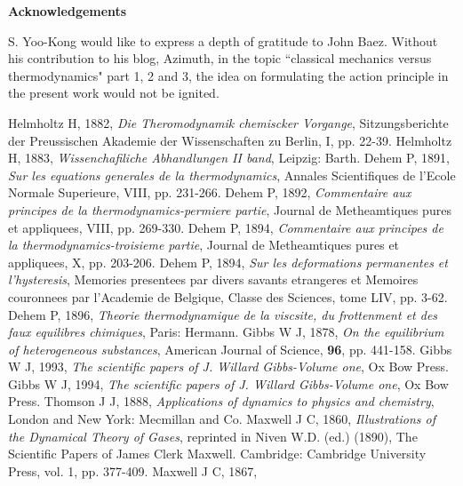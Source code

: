 \documentclass[12pt]{article}
\makeatletter
\numberwithin{equation}{section}
\newcommand\ackname{Acknowledgements}
\newenvironment{acknowledgements}{
	\titlepage
	\null\vfil
	\@beginparpenalty\@lowpenalty
	\begin{center}
		\bfseries \ackname
		\@endparpenalty\@M1
\end{center}}
{\par\vfil\null\endtitlepage}
\newenvironment{acknowledgements}{
	\if@twocolumn
	\section*{\abstractname}
	\else
	\small
	\begin{center}
		{\bfseries \ackname\vspace{-.5em}\vspace{\z@}}
	\end{center}
	\quotation
	\fi}
{\if@twocolumn\else\endquotation\fi}
\theoremstyle{remark}
\theoremstyle{definition}
\makeatother
\begin{document}
\begin{acknowledgements}

S. Yoo-Kong would like to express a depth of gratitude to John Baez. Without his contribution to his blog, Azimuth, in the topic ``classical mechanics versus thermodynamics" part 1, 2 and 3, the idea on formulating the action principle in the present work would not be ignited.
\end{acknowledgements}
\begin{thebibliography}{}
Helmholtz H, 1882, 
\emph{Die Theromodynamik chemiscker Vorgange}, 
Sitzungsberichte der Preussischen Akademie der Wissenschaften zu Berlin, I, pp. 22-39.
%
Helmholtz H, 1883, 
\emph{Wissenchafiliche Abhandlungen II band}, Leipzig: Barth.
%
%
Dehem P, 1891, 
\emph{Sur les equations generales de la thermodynamics}, Annales Scientifiques de l'Ecole Normale Superieure, VIII, pp. 231-266.
%
%
Dehem P, 1892, 
\emph{Commentaire aux principes de la thermodynamics-permiere partie}, Journal de Metheamtiques pures et appliquees, VIII, pp. 269-330.
%
%
Dehem P, 1894, 
\emph{Commentaire aux principes de la thermodynamics-troisieme partie}, Journal de Metheamtiques pures et appliquees, X, pp. 203-206.
%
%
Dehem P, 1894, 
\emph{Sur les deformations permanentes et l'hysteresis}, Memories presentees par divers savants etrangeres et Memoires couronnees par l'Academie de Belgique, Classe des Sciences, tome LIV, pp. 3-62.
%
%
Dehem P, 1896, 
\emph{Theorie thermodynamique de la viscsite, du frottenment et des faux equilibres chimiques}, Paris: Hermann.
%
Gibbs W J, 1878, 
\emph{On the equilibrium of heterogeneous substances}, 
American Journal of Science, \textbf{96}, pp. 441-158.
%
Gibbs W J, 1993, 
\emph{The scientific papers of J. Willard Gibbs-Volume one}, Ox Bow Press.
%
%
Gibbs W J, 1994, 
\emph{The scientific papers of J. Willard Gibbs-Volume one}, Ox Bow Press.
%
%
Thomson J J, 1888, 
\emph{Applications of dynamics to physics and chemistry}, London and New York: Mecmillan and Co.
%
%
Maxwell J C, 1860, 
\emph{Illustrations of the Dynamical Theory of Gases}, reprinted in Niven W.D. (ed.) (1890), The Scientific Papers of James Clerk Maxwell. Cambridge: Cambridge University Press, vol. 1, pp. 377-409.
%
%
Maxwell J C, 1867, 

\end{thebibliography}
\end{document}
